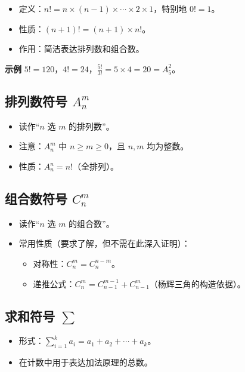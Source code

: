 \documentclass[10pt]{article}
\begin{document}
\begin{itemize}
\item 定义：\(n! = n \times (n-1) \times \cdots \times 2 \times 1\)，特别地 \(0! = 1\)。
\item 性质：\((n+1)! = (n+1) \times n!\)。
\item 作用：简洁表达排列数和组合数。
\end{itemize}

\textbf{示例}
\(5! = 120\)，\(4! = 24\)，\(\frac{5!}{3!} = 5 \times 4 = 20 = A_5^2\)。

\subsection{排列数符号 \(A_n^m\)}

\begin{itemize}
\item 读作“\(n\) 选 \(m\) 的排列数”。
\item 注意：\(A_n^m\) 中 \(n \ge m \ge 0\)，且 \(n,m\) 均为整数。
\item 性质：\(A_n^n = n!\)（全排列）。
\end{itemize}

\subsection{组合数符号 \(C_n^m\)}

\begin{itemize}
\item 读作“\(n\) 选 \(m\) 的组合数”。
\item 常用性质（要求了解，但不需在此深入证明）：
  \begin{itemize}
  \item 对称性：\(C_n^m = C_n^{n-m}\)。
  \item 递推公式：\(C_n^m = C_{n-1}^{m-1} + C_{n-1}^{m}\)（杨辉三角的构造依据）。
  \end{itemize}
\end{itemize}

\subsection{求和符号 \(\sum\)}

\begin{itemize}
\item 形式：\(\sum_{i=1}^{k} a_i = a_1 + a_2 + \cdots + a_k\)。
\item 在计数中用于表达加法原理的总数。
\end{itemize}
\end{document}
